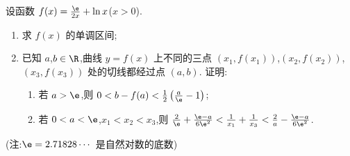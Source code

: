 \begin{problem}
设函数 \(f(x)=\frac{\e}{2x}+\ln x\)(\(x>0\)).

\begin{enumerate}
\item 求 \(f(x)\) 的单调区间;

\item 已知 \(a\),\(b\in\R\),曲线 \(y=f(x)\) 上不同的三点 \((x_1,f(x_1))\),\((x_2,f(x_2))\),\((x_3,f(x_3))\) 处的切线都经过点 \((a,b)\). 证明:

\begin{enumerate}
\item 若 \(a>\e\),则 \(0<b-f(a)<\frac12\left(\frac{a}{\e}-1\right)\);

\item 若 \(0<a<\e\),\(x_1<x_2<x_3\),则 \(\frac{2}{\e}+\frac{\e-a}{6\e^2}<\frac1{x_1}+\frac1{x_3}<\frac2a-\frac{\e-a}{6\e^2}\).
\end{enumerate}
\end{enumerate}

(注:\(\e=2.71828\cdots\) 是自然对数的底数)
\end{problem}

